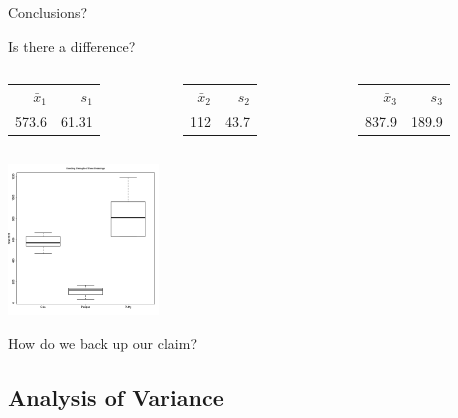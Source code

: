 \begin{frame}{Conclusions?}

  Is there a difference?

  \vfill

  \begin{columns}

      \begin{tabular}{rr}
        $\bar{x}_1$ & $s_1$ \\
        573.6 & 61.31
      \end{tabular}



      \begin{tabular}{rr}
        $\bar{x}_2$ & $s_2$ \\
        112 & 43.7
      \end{tabular}



      \begin{tabular}{rr}
        $\bar{x}_3$ & $s_3$ \\
        837.9 & 189.9
      \end{tabular}


  \end{columns}

  \vfill

  \centerline{\includegraphics[width=4cm]{img/periodontalBoxplot}}

  \vfill

  How do we back up our claim?

  \vfill
  
\end{frame}

\subsection{Analysis of Variance}

